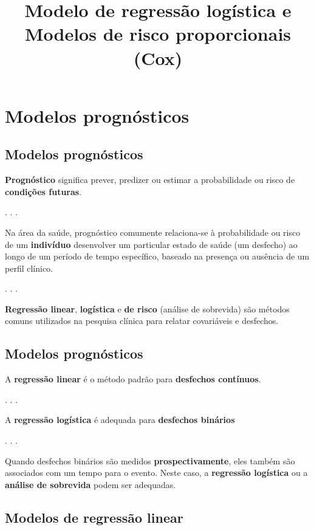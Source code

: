 \documentclass[
  letterpaper,
  DIV=11,
  numbers=noendperiod]{scrartcl}
\title{Modelo de regressão logística e Modelos de risco proporcionais
(Cox)}
\author{}
\date{}
\begin{document}
\maketitle


\section{Modelos prognósticos}\label{modelos-prognuxf3sticos}

\subsection{Modelos prognósticos}\label{modelos-prognuxf3sticos-1}

\textbf{Prognóstico} significa prever, predizer ou estimar a
probabilidade ou risco de \textbf{condições futuras}.

. . .

Na área da saúde, prognóstico comumente relaciona-se à probabilidade ou
risco de um \textbf{indivíduo} desenvolver um particular estado de saúde
(um desfecho) ao longo de um período de tempo específico, baseado na
presença ou ausência de um perfil clínico.

. . .

\textbf{Regressão linear}, \textbf{logística} e \textbf{de risco}
(análise de sobrevida) são métodos comuns utilizados na pesquisa clínica
para relatar covariáveis e desfechos.

\subsection{Modelos prognósticos}\label{modelos-prognuxf3sticos-2}

A \textbf{regressão linear} é o método padrão para \textbf{desfechos
contínuos}.

. . .

A \textbf{regressão logística} é adequada para \textbf{desfechos
binários}

. . .

Quando desfechos binários são medidos \textbf{prospectivamente}, eles
também são associados com um tempo para o evento. Neste caso, a
\textbf{regressão logística} ou a \textbf{análise de sobrevida} podem
ser adequadas.

\subsection{Modelos de regressão
linear}\label{modelos-de-regressuxe3o-linear}
\end{document}
